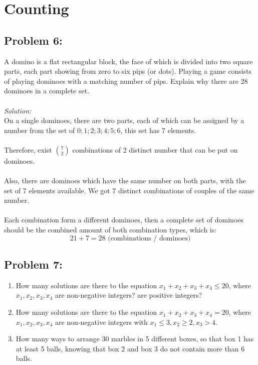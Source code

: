 \documentclass[a4paper]{article}
\begin{document}
\section*{Counting}
\subsection*{Problem 6:}
A domino is a
flat rectangular block, the face of which is divided into two square parts, each part showing from zero to six pips (or dots). Playing a game consists of playing dominoes with a matching number of pips. Explain why there are 28 dominoes in a complete set.\\\\
\textit{Solution:}\\
On a single dominoes, there are two parts, each of which can be assigned by a number from the set of ${0;1;2;3;4;5;6}$, this set has 7 elements.\\\\
Therefore, exist ${7 \choose 2}$ combinations of 2 distinct number that can be put on dominoes.\\\\
Also, there are dominoes which have the same number on both parts, with the set of 7 elements available. We got 7 distinct combinations of couples of the same number.\\\\
Each combination form a different dominoes, then a complete set of dominoes should be the combined amount of both combination types, which is:
\begin{equation*}
	21 + 7 = 28 \text{ (combinations / dominoes)}
\end{equation*}

\subsection*{Problem 7:}
\begin{enumerate}
	\item How many solutions are there to the equation $x_1 + x_2 + x_3 + x_4 \leq 20$, where $x_1, x_2, x_3, x_4$ are non-negative integers? are positive integers?
	\item How many solutions are there to the equation $x_1 + x_2 + x_3 + x_4 = 20$, where $x_1, x_2, x_3, x_4$ are non-negative integers with $x_1 \leq 3, x_2 \geq 2, x_3 > 4$.
	\item How many ways to arrange 30 marbles in 5 different boxes, so that box 1 has at least 5 balls, knowing that box 2 and box 3 do not contain more than 6 balls.
\end{enumerate}
\end{document}
